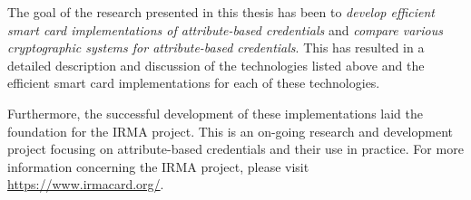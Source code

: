 The goal of the research presented in this thesis has been to \emph{develop 
efficient smart card implementations of attribute-based credentials} and 
\emph{compare various cryptographic systems for attribute-based credentials}. 
This has resulted in a detailed description and discussion of the
technologies listed above and the efficient smart card implementations
for each of these technologies.

Furthermore, the successful development of these implementations laid
the foundation for the IRMA project. This is an on-going research and
development project focusing on attribute-based credentials and their
use in practice. For more information concerning the IRMA project,
please visit \url{https://www.irmacard.org/}.
